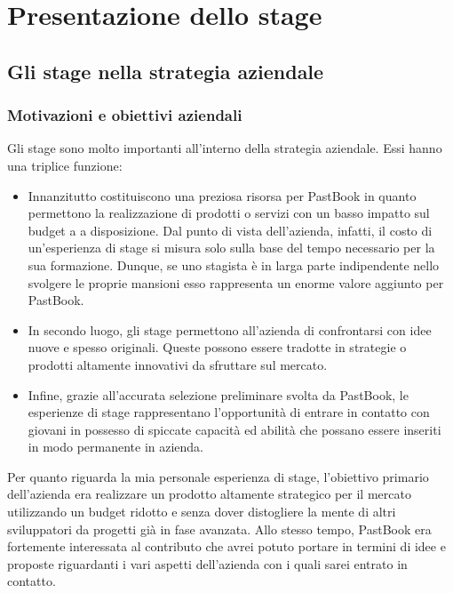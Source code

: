\chapter{Presentazione dello stage}
	\section{Gli stage nella strategia aziendale}
		\subsection{Motivazioni e obiettivi aziendali}
			Gli stage sono molto importanti all'interno della strategia aziendale. Essi hanno una triplice funzione:
			\begin{itemize}
				\item Innanzitutto costituiscono una preziosa risorsa per PastBook in quanto permettono la realizzazione di prodotti
				o servizi con un basso impatto sul budget a a disposizione. Dal punto di vista dell'azienda, infatti, il costo di
				un'esperienza di stage si misura solo sulla base del tempo necessario per la sua formazione. Dunque, se uno stagista
				è in larga parte indipendente nello svolgere le proprie mansioni esso rappresenta un enorme valore aggiunto per
				PastBook.
				\item In secondo luogo, gli stage permettono all'azienda di confrontarsi con idee nuove e spesso originali. Queste
				possono essere tradotte in strategie o prodotti altamente innovativi da sfruttare sul mercato.
				\item Infine, grazie all'accurata selezione preliminare svolta da PastBook, le esperienze di stage rappresentano
				l'opportunità di entrare in contatto con giovani in possesso di spiccate capacità ed abilità che possano essere
				inseriti in modo permanente in azienda.
			\end{itemize}
			Per quanto riguarda la mia personale esperienza di stage, l'obiettivo primario dell'azienda era realizzare un
			prodotto altamente strategico per il mercato utilizzando un budget ridotto e senza dover distogliere la mente di altri
			sviluppatori da progetti già in fase avanzata. Allo stesso tempo, PastBook era fortemente interessata al contributo che avrei
			potuto portare in termini di idee e proposte riguardanti i vari aspetti dell'azienda con i quali sarei entrato in contatto.

